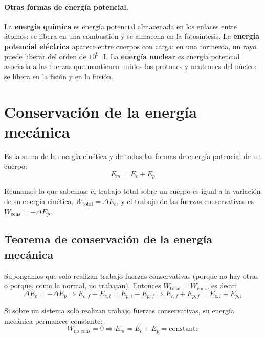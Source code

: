 \paragraph{Otras formas de energía potencial.} La \textbf{energía química} es energía potencial almacenada en los enlaces entre
átomos: se libera en una combustión y se almacena en la fotosíntesis. La \textbf{energía potencial eléctrica} aparece entre cuerpos
con carga: en una tormenta, un rayo puede liberar del orden de \(10^9\)~J. La \textbf{energía nuclear} es energía potencial asociada a
las fuerzas que mantienen unidos los protones y neutrones del núcleo; se libera en la fisión y en la fusión.

\section{Conservación de la energía mecánica}\label{sec:ud12-conservacion}

\begin{definition}
    Es la suma de la energía cinética y de todas las formas de energía potencial de un cuerpo:
    \[ E_m = E_c + E_p \]
\end{definition}

Reunamos lo que sabemos: el trabajo total sobre un cuerpo es igual a la variación de su energía cinética, \(W_{\text{total}} = \Delta E_c\),
y el trabajo de las fuerzas conservativas es \(W_{\text{cons}} = -\Delta E_p\).

\subsection{Teorema de conservación de la energía mecánica}

Supongamos que solo realizan trabajo fuerzas conservativas (porque no hay otras o porque, como la normal, no trabajan). Entonces
\(W_{\text{total}} = W_{\text{cons}}\), es decir:
\[ \Delta E_c = -\Delta E_p \Rightarrow E_{c,f} - E_{c,i} = E_{p,i} - E_{p,f} \Rightarrow E_{c,f} + E_{p,f} = E_{c,i} + E_{p,i} \]

\begin{definition}
    Si sobre un sistema solo realizan trabajo fuerzas conservativas, su energía mecánica permanece constante:
    \[ W_{\text{no cons}} = 0 \Rightarrow E_m = E_c + E_p = \text{constante} \]
\end{definition}

